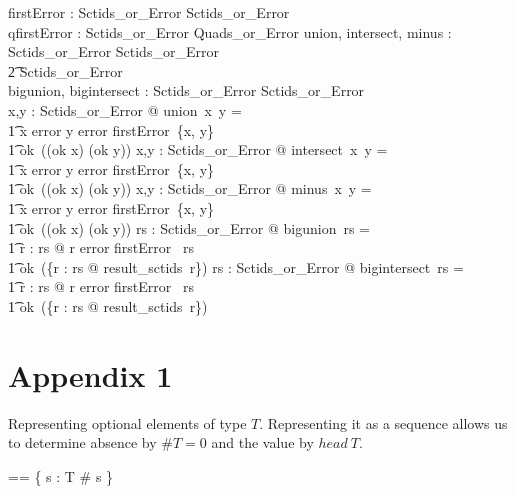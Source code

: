 \documentclass{article}
\begin{document}
\begin{gendef}
   firstError : \power Sctids\_or\_Error \pfun Sctids\_or\_Error \\
   qfirstError : \power Sctids\_or\_Error \pfun Quads\_or\_Error 
\also
   union, intersect, minus : Sctids\_or\_Error \fun Sctids\_or\_Error \fun \\
\t2 Sctids\_or\_Error \\
   bigunion, bigintersect : \power Sctids\_or\_Error \fun Sctids\_or\_Error \\
\where
   \forall x,y : Sctids\_or\_Error @ union~x~y = \\
\t1 \IF x \in \ran error \lor  y \in \ran error \THEN firstError~\{x, y\} \\
\t1 \ELSE ok~((ok \inv x) \cup (ok \inv y))
\also
   \forall x,y : Sctids\_or\_Error @ intersect~x~y = \\
\t1 \IF x \in \ran error \lor y \in \ran error \THEN firstError~\{x, y\} \\
\t1 \ELSE ok~((ok \inv x) \cap (ok \inv y))
\also
   \forall x,y : Sctids\_or\_Error @ minus~x~y = \\
\t1 \IF x \in \ran error \lor y \in \ran error \THEN firstError~\{x, y\} \\
\t1 \ELSE ok~((ok \inv x) \setminus (ok \inv y))
\also
  \forall rs : \power Sctids\_or\_Error @ bigunion~rs = \\
\t1 \IF \exists r : rs @ r \in \ran error \THEN firstError~ rs \\
\t1 \ELSE ok~(\bigcup \{r : rs @ result\_sctids~r\})
\also
  \forall rs : \power Sctids\_or\_Error @ bigintersect~rs = \\
\t1 \IF \exists r : rs @ r \in \ran error \THEN firstError~ rs \\
\t1 \ELSE ok~(\bigcap \{r : rs @ result\_sctids~r\})
\end{gendef}

   

\section{Appendix 1}
Representing optional elements of type $T$.  Representing it as a sequence allows us to
determine absence by $\#T = 0$ and the value by $head~T$. 

\begin{zed} 
  \optional[T] == \{ s : \seq T \mid \# s  \} 
\end{zed}

   
\end{document}
